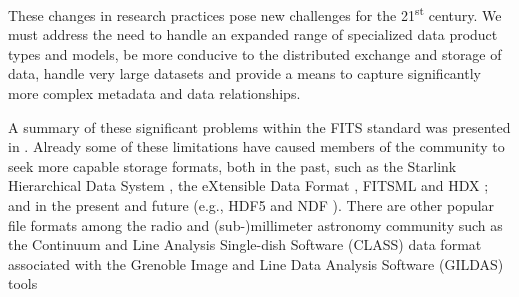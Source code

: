 \documentclass[final,authoryear,5p,times,twocolumn]{elsarticle}
\begin{document}
These changes in research practices pose new challenges for the
21\textsuperscript{st} century. We must address the need to handle an
expanded range of specialized data product types and models, be more
conducive to the distributed exchange and storage of data, handle very
large datasets and provide a means to capture significantly more complex
metadata and data relationships.


A summary of these significant problems within the FITS standard was
presented in \citet{P90_adassxxiii}.  Already some of these limitations
have caused members of the community to seek more capable storage
formats, both in the past, such as the Starlink Hierarchical Data System
\citep[HDS;][]{1982QJRAS..23..485D}, the eXtensible Data Format
\citep[XDF;][]{2001ASPC..238..217S}, FITSML \citep{2001ASPC..238..487T}
and HDX \citep{2003ASPC..295..221G}; and in the present and future
(e.g., HDF5 \citep{2011ASPC..442...53A} and NDF \citep{2015Jenness}).
There are other popular file formats among the
radio and (sub-)millimeter astronomy community such as the Continuum and
Line Analysis Single-dish Software (CLASS) data format associated with
the Grenoble Image and Line Data Analysis Software (GILDAS) tools
\end{document}
